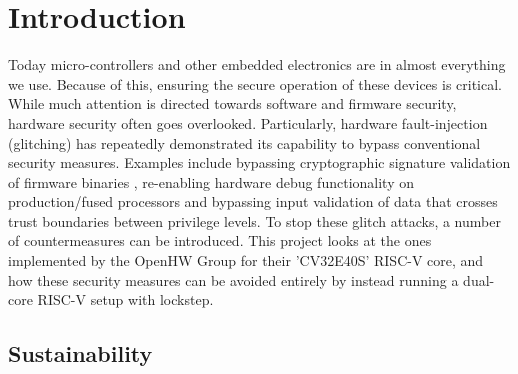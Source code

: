 \chapter{Introduction}
\label{intro} 

Today micro-controllers and other embedded electronics are in almost everything we use. Because of this, ensuring the secure operation of these devices is critical. While much attention is directed towards software and firmware security, hardware security often goes overlooked. Particularly, hardware fault-injection (glitching) has repeatedly demonstrated its capability to bypass conventional security measures. Examples include bypassing cryptographic signature validation of firmware binaries \cite{hole_in_soc}, re-enabling hardware debug functionality on production/fused processors\cite{reenable_debug} and bypassing input validation of data that crosses trust boundaries between privilege levels\cite{qualcom}. To stop these glitch attacks, a number of countermeasures can be introduced. This project looks at the ones implemented by the OpenHW Group for their 'CV32E40S' RISC-V core\cite{cv32e40s_manual}, and how these security measures can be avoided entirely by instead running a dual-core RISC-V setup with lockstep. 

\section{Sustainability}
